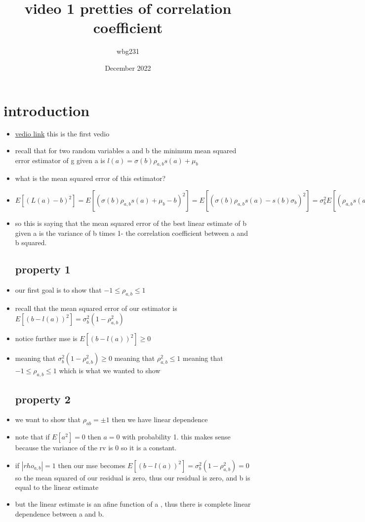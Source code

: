 \documentclass{article}
\title{video 1 pretties of correlation coefficient}
\author{wbg231 }
\date{December 2022}
\begin{document}
\maketitle

\section{introduction}
\begin{itemize}
\item 
\href{https://www.youtube.com/watch?v=oWhVVLUjYvU&list=PLBEf5mJtE6KuZ5NBQMuWIMsiOOrV9ibzm&index=61}{vedio link} this is the first vedio 

\item recall that for two random variables a and b the minimum mean squared error estimator of g given a is $l(a)=\sigma(b)\rho_{a,b}s(a)+\mu_{b}$
\item what is the mean squared error of this estimator? 
\item $E[(L(a)-b)^2]=E[(\sigma(b)\rho_{a,b}s(a)+\mu_{b}-b)^2]=E[(\sigma(b)\rho_{a,b}s(a)-s(b)\sigma_{b})^2]=\sigma_{b}^2E[(\rho_{a,b}s(a)-s(b))^2]=\sigma^2_{b}(\rho_{a,b}^2E[s(a)^2]+E[s(b)^2]-2\rho_{a,b}E[s(a)s(b)])=\sigma^2_{b}(\rho_{a,b}^2+1-2\rho_{a,b}^2)=\sigma_{b}^2(1-\rho^2_{a,b})$
\item so this is saying that the mean squared error of the best linear estimate of b given a is the variance of b times 1- the correlation coefficient between a and b squared. 
\subsection{property 1}
\item our first goal is to show that $-1\leq \rho_{a,b}\leq 1$ 
\item recall that the mean squared error of our estimator is $E[(b-l(a))^2]=\sigma_{b}^2(1-\rho^2_{a,b})$
\item notice further mse is $E[(b-l(a))^2] \geq 0$
\item meaning that $\sigma_{b}^2(1-\rho^2_{a,b})\geq 0$ meaning that $\rho_{a,b}^{2}\leq 1$ meaning that $-1\leq \rho_{a,b}\leq 1$ which is what we wanted to show 
\subsection{property 2 }
\item we want to show that $\rho_{ab}=\pm 1$ then we have linear dependence
\item note that if $E[a^2]=0$ then $a=0$ with probability 1. this makes sense because the variance of the rv is 0 so it is a constant.
\item if $|rho_{a,b}|=1$ then our mse becomes  $E[(b-l(a))^2]=\sigma_{b}^2(1-\rho^2_{a,b})=0$ so the mean squared of our residual is zero, thus our residual is zero, and b is equal to the linear estimate 
\item but the linear estimate is an afine function of a , thus there is complete linear dependence between a and b. 

\end{itemize}
\end{document}
